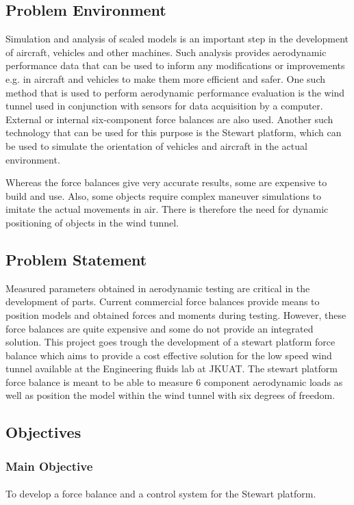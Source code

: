 \subsection{Problem Environment}
Simulation and analysis of scaled models is an important step in the development of aircraft, vehicles and other machines. Such analysis provides aerodynamic performance data that can be used to inform any modifications or improvements e.g. in aircraft and vehicles to make them more efficient and safer. One such method that is used to perform aerodynamic performance evaluation is the wind tunnel used in conjunction with sensors for data acquisition by a computer. External or internal six-component force balances are also used. Another such technology that can be used for this purpose is the Stewart platform, which can be used to simulate the
orientation of vehicles and aircraft in the actual environment.

Whereas the force balances give very accurate results, some are expensive to build and use. Also, some objects require complex maneuver simulations to imitate the actual movements in air. There is therefore the need for dynamic positioning of objects in the wind tunnel.
\subsection{Problem Statement}
Measured parameters obtained in aerodynamic testing are critical in the development of parts. Current commercial force balances provide means to position models and obtained forces and moments during testing.
However, these force balances are quite expensive and some do not provide an integrated solution. This project goes trough the development of a stewart platform force balance which aims to provide a cost effective solution for the low speed wind tunnel available at the Engineering fluids lab at JKUAT.
The stewart platform force balance is meant to be able to measure 6 component aerodynamic loads as well as position the model within the wind tunnel with six degrees of freedom.
\subsection{Objectives}
\subsubsection{Main Objective}
\paragraph{} To develop a force balance and a control system for the Stewart platform.
